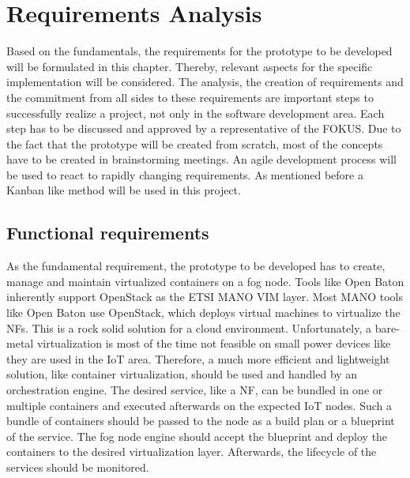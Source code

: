 \chapter{Requirements Analysis}
\label{chapter:requirements-analysis}
\minitoc\vspace{.5cm}
Based on the fundamentals, the requirements for the prototype to be developed will be formulated in this chapter.
Thereby, relevant aspects for the specific implementation will be considered.
The analysis, the creation of requirements and the commitment from all sides to these requirements are important steps to successfully realize a project, not only in the software development area.
Each step has to be discussed and approved by a representative of the \ac{FOKUS}.
Due to the fact that the prototype will be created from scratch, most of the concepts have to be created in brainstorming meetings.
An agile development process will be used to react to rapidly changing requirements.
As mentioned before a Kanban like method will be used in this project.


\section{Functional requirements}
\label{section:functional-requirements}
As the fundamental requirement, the prototype to be developed has to create, manage and maintain virtualized containers on a fog node.
Tools like Open Baton inherently support OpenStack as the \ac{ETSI} \ac{MANO} \ac{VIM} layer.
Most \ac{MANO} tools like Open Baton use OpenStack, which deploys virtual machines to virtualize the \acp{NF}.
This is a rock solid solution for a cloud environment.
Unfortunately, a bare-metal virtualization is most of the time not feasible on small power devices like they are used in the \ac{IoT} area.
Therefore, a much more efficient and lightweight solution, like container virtualization, should be used and handled by an orchestration engine.
The desired service, like a \ac{NF}, can be bundled in one or multiple containers and executed afterwards on the expected \ac{IoT} nodes.
Such a bundle of containers should be passed to the node as a build plan or a blueprint of the service.
The fog node engine should accept the blueprint and deploy the containers to the desired virtualization layer.
Afterwards, the lifecycle of the services should be monitored.

